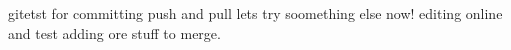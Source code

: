 gitetst for committing push and pull
lets try soomething else now!
editing online and test
adding ore stuff to merge.
